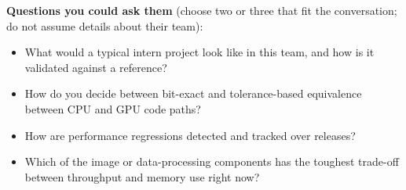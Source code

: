 \textbf{Questions you could ask them} (choose two or three that fit the conversation; do not assume details about their team):
\begin{itemize}
\item What would a typical intern project look like in this team, and how is it validated against a reference?
\item How do you decide between bit-exact and tolerance-based equivalence between CPU and GPU code paths?
\item How are performance regressions detected and tracked over releases?
\item Which of the image or data-processing components has the toughest trade-off between throughput and memory use right now?
\end{itemize}
